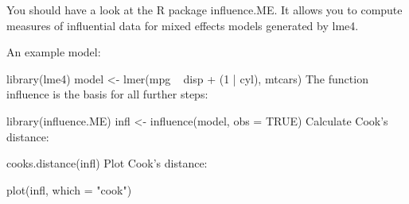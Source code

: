 You should have a look at the R package influence.ME. It allows you to compute measures of influential data for mixed effects models generated by lme4.

An example model:

library(lme4)
model <- lmer(mpg ~ disp + (1 | cyl), mtcars)
The function influence is the basis for all further steps:

library(influence.ME)
infl <- influence(model, obs = TRUE)
Calculate Cook's distance:

cooks.distance(infl)
Plot Cook's distance:

plot(infl, which = "cook")
